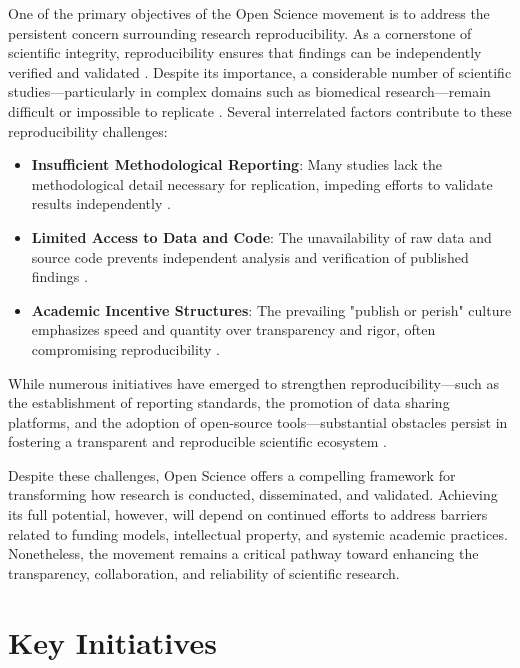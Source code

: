 \documentclass[final]{rc-book-2.14}
\begin{document}
One of the primary objectives of the Open Science movement is to address the persistent concern surrounding research reproducibility. As a cornerstone of scientific integrity, reproducibility ensures that findings can be independently verified and validated \cite{Nosek2015}. Despite its importance, a considerable number of scientific studies—particularly in complex domains such as biomedical research—remain difficult or impossible to replicate \cite{Borgman2012}. Several interrelated factors contribute to these reproducibility challenges:

\begin{itemize}
    \item \textbf{Insufficient Methodological Reporting}: Many studies lack the methodological detail necessary for replication, impeding efforts to validate results independently \cite{Leonelli2016}.
    \item \textbf{Limited Access to Data and Code}: The unavailability of raw data and source code prevents independent analysis and verification of published findings \cite{Piwowar2011}.
    \item \textbf{Academic Incentive Structures}: The prevailing "publish or perish" culture emphasizes speed and quantity over transparency and rigor, often compromising reproducibility \cite{Boulton2015}.
\end{itemize}

While numerous initiatives have emerged to strengthen reproducibility—such as the establishment of reporting standards, the promotion of data sharing platforms, and the adoption of open-source tools—substantial obstacles persist in fostering a transparent and reproducible scientific ecosystem \cite{Nosek2015}.

Despite these challenges, Open Science offers a compelling framework for transforming how research is conducted, disseminated, and validated. Achieving its full potential, however, will depend on continued efforts to address barriers related to funding models, intellectual property, and systemic academic practices. Nonetheless, the movement remains a critical pathway toward enhancing the transparency, collaboration, and reliability of scientific research.


\section{Key Initiatives}
\label{chp:review:sec:key_init}
\end{document}
